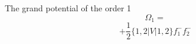 \documentclass{article}
\begin{document}
The grand potential of the order 1
\[\Omega_{1} = \]
\[+\frac{1}{2}\{1,2|V|1,2\}f_{1}^{-}f_{2}^{-}\]
\end{document}
